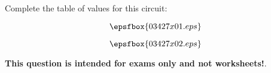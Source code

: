

Complete the table of values for this circuit:

$$\epsfbox{03427x01.eps}$$







$$\epsfbox{03427x02.eps}$$







{\bf This question is intended for exams only and not worksheets!}.



